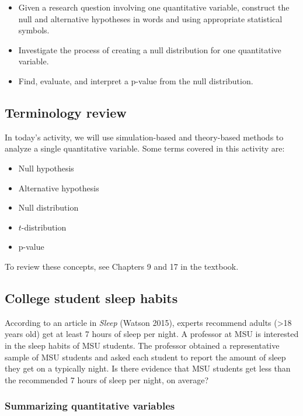\documentclass[
]{report}
\begin{document}
\begin{itemize}
\item
  Given a research question involving one quantitative variable, construct the null and alternative hypotheses
  in words and using appropriate statistical symbols.
\item
  Investigate the process of creating a null distribution for one quantitative variable.
\item
  Find, evaluate, and interpret a p-value from the null distribution.
\end{itemize}

\subsection{Terminology review}\label{terminology-review-1}

In today's activity, we will use simulation-based and theory-based methods to analyze a single quantitative variable. Some terms covered in this activity are:

\begin{itemize}
\item
  Null hypothesis
\item
  Alternative hypothesis
\item
  Null distribution
\item
  \(t\)-distribution
\item
  p-value
\end{itemize}

To review these concepts, see Chapters 9 and 17 in the textbook.

\subsection{College student sleep habits}\label{college-student-sleep-habits}

According to an article in \emph{Sleep} (Watson 2015), experts recommend adults (\textgreater18 years old) get at least 7 hours of sleep per night. A professor at MSU is interested in the sleep habits of MSU students. The professor obtained a representative sample of MSU students and asked each student to report the amount of sleep they get on a typically night. Is there evidence that MSU students get less than the recommended 7 hours of sleep per night, on average?

\subsubsection*{Summarizing quantitative variables}\label{summarizing-quantitative-variables-1}
\end{document}

